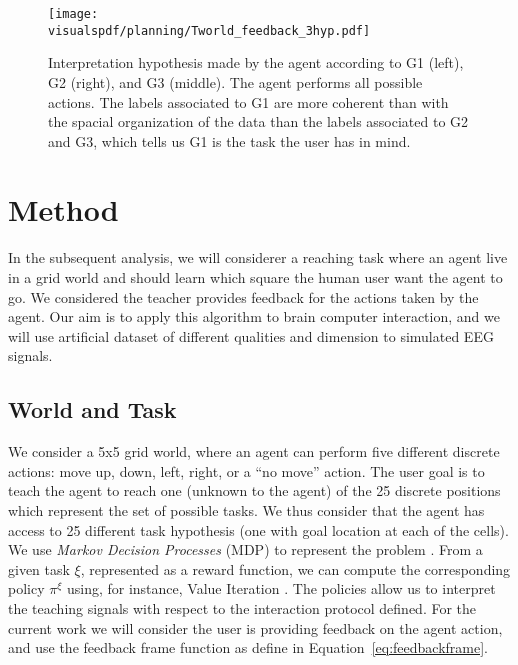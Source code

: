 \begin{figure}[H]
  \centering
  \texttt{[image: \\visualspdf/planning/Tworld\_feedback\_3hyp.pdf]}
  \caption{Interpretation hypothesis made by the agent according to G1 (left), G2 (right), and G3 (middle). The agent performs all possible actions. The labels associated to G1 are more coherent than with the spacial organization of the data than the labels associated to G2 and G3, which tells us G1 is the task the user has in mind.}
  \label{fig:planning3hyp}
\end{figure}

\section{Method}
\label{chapter:planning:method}

In the subsequent analysis, we will considerer a reaching task where an agent live in a grid world and should learn which square the human user want the agent to go. We considered the teacher provides feedback for the actions taken by the agent. Our aim is to apply this algorithm to brain computer interaction, and we will use artificial dataset of different qualities and dimension to simulated EEG signals.

\subsection{World and Task}
We consider a 5x5 grid world, where an agent can perform five different discrete actions: move up, down, left, right, or a ``no move'' action. The user goal is to teach the agent to reach one (unknown to the agent) of the 25 discrete positions which represent the set of possible tasks. We thus consider that the agent has access to 25 different task hypothesis (one with goal location at each of the cells). We use \textit{Markov Decision Processes} (MDP) to represent the problem \cite{sutton1998reinforcement}. From a given task $\xi$, represented as a reward function, we can compute the corresponding policy $\pi^{\xi}$ using, for instance, Value Iteration \cite{sutton1998reinforcement}. The policies allow us to interpret the teaching signals with respect to the interaction protocol defined. For the current work we will consider the user is providing feedback on the agent action, and use the feedback frame function as define in Equation~\ref{eq:feedbackframe}.

